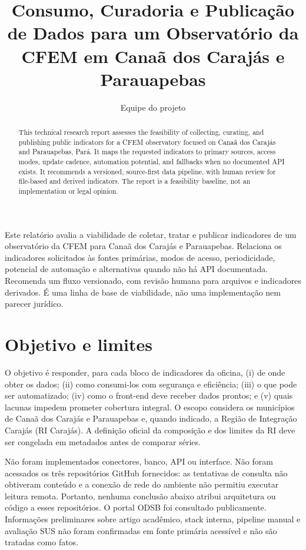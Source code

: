 \documentclass[12pt]{article}
\title{Consumo, Curadoria e Publicação de Dados para um Observatório da CFEM em Canaã dos Carajás e Parauapebas}
\author{Equipe do projeto}
\begin{document}
\maketitle

\begin{abstract}
This technical research report assesses the feasibility of collecting, curating, and publishing public indicators for a CFEM observatory focused on Canaã dos Carajás and Parauapebas, Pará. It maps the requested indicators to primary sources, access modes, update cadence, automation potential, and fallbacks when no documented API exists. It recommends a versioned, source-first data pipeline, with human review for file-based and derived indicators. The report is a feasibility baseline, not an implementation or legal opinion.
\end{abstract}

\begin{resumo}
Este relatório avalia a viabilidade de coletar, tratar e publicar indicadores de um observatório da CFEM para Canaã dos Carajás e Parauapebas. Relaciona os indicadores solicitados às fontes primárias, modos de acesso, periodicidade, potencial de automação e alternativas quando não há API documentada. Recomenda um fluxo versionado, com revisão humana para arquivos e indicadores derivados. É uma linha de base de viabilidade, não uma implementação nem parecer jurídico.
\end{resumo}

\section{Objetivo e limites}
O objetivo é responder, para cada bloco de indicadores da oficina, (i) de onde obter os dados; (ii) como consumi-los com segurança e eficiência; (iii) o que pode ser automatizado; (iv) como o front-end deve receber dados prontos; e (v) quais lacunas impedem prometer cobertura integral. O escopo considera os municípios de Canaã dos Carajás e Parauapebas e, quando indicado, a Região de Integração Carajás (RI Carajás). A definição oficial da composição e dos limites da RI deve ser congelada em metadados antes de comparar séries.

Não foram implementados conectores, banco, API ou interface. Não foram acessados os três repositórios GitHub fornecidos: as tentativas de consulta não obtiveram conteúdo e a conexão de rede do ambiente não permitiu executar leitura remota. Portanto, nenhuma conclusão abaixo atribui arquitetura ou código a esses repositórios. O portal ODSB foi consultado publicamente. Informações preliminares sobre artigo acadêmico, stack interna, pipeline manual e avaliação SUS não foram confirmadas em fonte primária acessível e não são tratadas como fatos.
\end{document}
